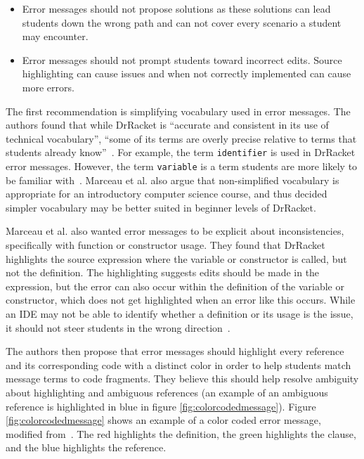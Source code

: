 \documentclass{sig-alternate}
\begin{document}
\begin{itemize}
	\item Error messages should not propose solutions as these solutions can lead students down the wrong path and can not cover every scenario a student may encounter.
	\item Error messages should not prompt students toward incorrect edits. Source highlighting can cause issues and when not correctly implemented can cause more errors.
\end{itemize}

The first recommendation is simplifying vocabulary used in error messages.
The authors found that while DrRacket is ``accurate and consistent in its use of technical vocabulary'', ``some of its terms are overly precise relative to terms that students already know''~\cite{Marceau:2011:MYL:2048237.2048241}.
For example, the term \texttt{identifier} is used in DrRacket error messages. However, the term \texttt{variable} is a term students are more likely to be familiar with~\cite{Marceau:2011:MYL:2048237.2048241}.
Marceau et al. also argue that non-simplified vocabulary is appropriate for an introductory computer science course, and thus decided simpler vocabulary may be better suited in beginner levels of DrRacket.

Marceau et al. also wanted error messages to be explicit about inconsistencies, specifically with function or constructor usage.
They found that DrRacket highlights the source expression where the variable or constructor is called, but not the definition.
The highlighting suggests edits should be made in the expression, but the error can also occur within the definition of the variable or constructor, which does not get highlighted when an error like this occurs.
While an IDE may not be able to identify whether a definition or its usage is the issue, it should not steer students in the wrong direction~\cite{Marceau:2011:MYL:2048237.2048241}.

The authors then propose that error messages should highlight every reference and its corresponding code with a distinct color in order to help students match message terms to code fragments.
They believe this should help resolve ambiguity about highlighting and ambiguous references (an example of an ambiguous reference is highlighted in blue in figure \ref{fig:colorcodedmessage}).
Figure \ref{fig:colorcodedmessage} shows an example of a color coded error message, modified from~\cite{Marceau:2011:MYL:2048237.2048241}.
The red highlights the definition, the green highlights the clause, and the blue highlights the reference.
\end{document}

